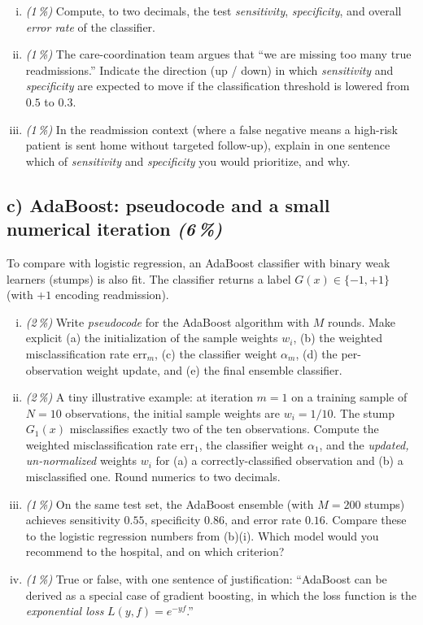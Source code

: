 \documentclass[11pt,a4paper]{article}
\newcommand{\subpoints}[1]{\textit{(#1\,\%)}}
\begin{document}
\begin{enumerate}[(i)]
  \item \subpoints{1} Compute, to two decimals, the test \emph{sensitivity}, \emph{specificity}, and overall \emph{error rate} of the classifier.
  \item \subpoints{1} The care-coordination team argues that ``we are missing too many true readmissions.'' Indicate the direction (up / down) in which \emph{sensitivity} and \emph{specificity} are expected to move if the classification threshold is lowered from $0.5$ to $0.3$.
  \item \subpoints{1} In the readmission context (where a false negative means a high-risk patient is sent home without targeted follow-up), explain in one sentence which of \emph{sensitivity} and \emph{specificity} you would prioritize, and why.
\end{enumerate}

\subsection*{c) AdaBoost: pseudocode and a small numerical iteration \subpoints{6}}

To compare with logistic regression, an AdaBoost classifier with binary weak learners (stumps) is also fit. The classifier returns a label $G(x) \in \{-1, +1\}$ (with $+1$ encoding readmission).

\begin{enumerate}[(i)]
  \item \subpoints{2} Write \emph{pseudocode} for the AdaBoost algorithm with $M$ rounds. Make explicit (a) the initialization of the sample weights $w_i$, (b) the weighted misclassification rate $\mathrm{err}_m$, (c) the classifier weight $\alpha_m$, (d) the per-observation weight update, and (e) the final ensemble classifier.
  \item \subpoints{2} A tiny illustrative example: at iteration $m = 1$ on a training sample of $N = 10$ observations, the initial sample weights are $w_i = 1/10$. The stump $G_1(x)$ misclassifies exactly two of the ten observations. Compute the weighted misclassification rate $\mathrm{err}_1$, the classifier weight $\alpha_1$, and the \emph{updated, un-normalized} weights $w_i$ for (a) a correctly-classified observation and (b) a misclassified one. Round numerics to two decimals.
  \item \subpoints{1} On the same test set, the AdaBoost ensemble (with $M = 200$ stumps) achieves sensitivity $0.55$, specificity $0.86$, and error rate $0.16$. Compare these to the logistic regression numbers from (b)(i). Which model would you recommend to the hospital, and on which criterion?
  \item \subpoints{1} True or false, with one sentence of justification: ``AdaBoost can be derived as a special case of gradient boosting, in which the loss function is the \emph{exponential loss} $L(y, f) = e^{-y f}$.''
\end{enumerate}
\end{document}
